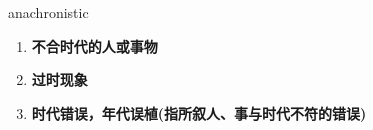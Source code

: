 
\begin{frame}
{\huge anachronistic}
\begin{center}
\begin{enumerate}\Large
  \item \textbf{不合时代的人或事物}
  \item \textbf{过时现象}
  \item \textbf{时代错误，年代误植(指所叙人、事与时代不符的错误)}
\end{enumerate}
\end{center}
\end{frame}
